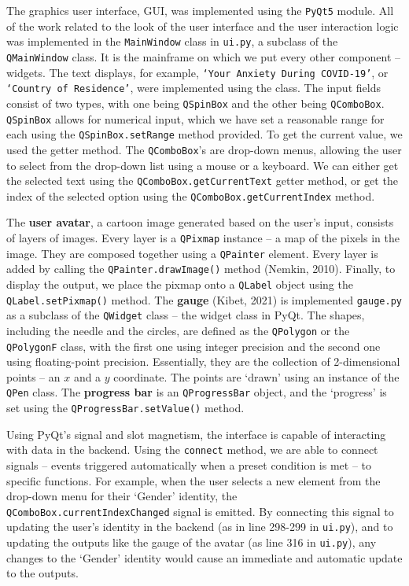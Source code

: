 \documentclass[fontsize=11pt]{article}
\begin{document}
    The graphics user interface, GUI, was implemented using the \texttt{PyQt5} module. All of the work related to the look of the user interface and the user interaction logic was implemented in the \texttt{MainWindow} class in \texttt{ui.py}, a subclass of the \texttt{QMainWindow} class. It is the mainframe on which we put every other component -- widgets. The text displays, for example, \texttt{`Your Anxiety During COVID-19'}, or \texttt{`Country of Residence'}, were implemented using the  class. The input fields consist of two types, with one being \texttt{QSpinBox} and the other being \texttt{QComboBox}. \texttt{QSpinBox} allows for numerical input, which we have set a reasonable range for each using the \texttt{QSpinBox.setRange} method provided. To get the current value, we used the  getter method. The \texttt{QComboBox}'s are drop-down menus, allowing the user to select from the drop-down list using a mouse or a keyboard. We can either get the selected text using the \texttt{QComboBox.getCurrentText} getter method, or get the index of the selected option using the \texttt{QComboBox.getCurrentIndex} method.

    The \textbf{user avatar}, a cartoon image generated based on the user's input, consists of layers of images. Every layer is a \texttt{QPixmap} instance -- a map of the pixels in the image. They are composed together using a \texttt{QPainter} element. Every layer is added by calling the \texttt{QPainter.drawImage()} method (Nemkin, 2010). Finally, to display the output, we place the pixmap onto a \texttt{QLabel} object using the \texttt{QLabel.setPixmap()} method. The \textbf{gauge} (Kibet, 2021) is implemented \texttt{gauge.py} as a subclass of the \texttt{QWidget} class -- the widget class in PyQt. The shapes, including the needle and the circles, are defined as the \texttt{QPolygon} or the \texttt{QPolygonF} class, with the first one using integer precision and the second one using floating-point precision. Essentially, they are the collection of 2-dimensional points -- an $x$ and a $y$ coordinate. The points are `drawn' using an instance of the \texttt{QPen} class. The \textbf{progress bar} is an \texttt{QProgressBar} object, and the `progress' is set using the \texttt{QProgressBar.setValue()} method.

    Using PyQt's signal and slot magnetism, the interface is capable of interacting with data in the backend. Using the \texttt{connect} method, we are able to connect signals -- events triggered automatically when a preset condition is met -- to specific functions. For example, when the user selects a new element from the drop-down menu for their `Gender' identity, the \texttt{QComboBox.currentIndexChanged} signal is emitted. By connecting this signal to updating the user's identity in the backend (as in line 298-299 in \texttt{ui.py}), and to updating the outputs like the gauge of the avatar (as line 316 in \texttt{ui.py}), any changes to the `Gender' identity would cause an immediate and automatic update to the outputs.
\end{document}
